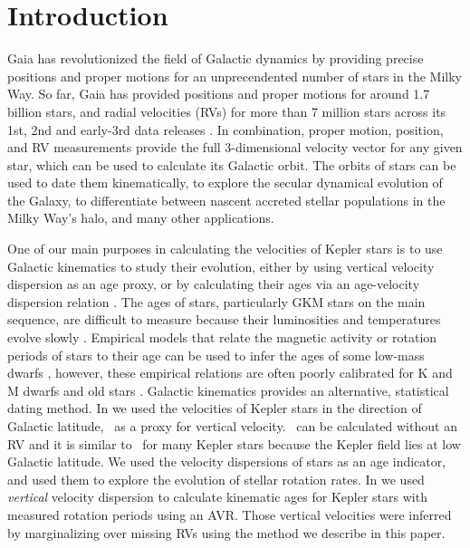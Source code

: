 \section{Introduction}

Gaia has revolutionized the field of Galactic dynamics by providing precise
positions and proper motions for an unprecendented number of stars in the
Milky Way.
So far, Gaia has provided positions and proper motions for around 1.7 billion
stars, and radial velocities (RVs) for more than 7 million stars across its
1st, 2nd and early-3rd data releases \citep{gaia, gaia_dr2, gaia_edr3}.
In combination, proper motion, position, and RV measurements provide the full
3-dimensional velocity vector for any given star, which can be used to
calculate its Galactic orbit.
The orbits of stars can be used to date them kinematically, to explore the
secular dynamical evolution of the Galaxy, to differentiate between nascent
accreted stellar populations in the Milky Way's halo, and many other
applications.

One of our main purposes in calculating the velocities of Kepler stars is to
use Galactic kinematics to study their evolution, either by using vertical
velocity dispersion as an age proxy, or by calculating their ages via an
age-velocity dispersion relation \citep[\eg][]{angus2020, lu2021}.
The ages of stars, particularly GKM stars on the main sequence, are difficult
to measure because their luminosities and temperatures evolve slowly
\citep[see][for a review of stellar ages]{soderblom2010}.
Empirical models that relate the magnetic activity or rotation periods of
stars to their age can be used to infer the ages of some low-mass dwarfs
\citep[\eg][]{skumanich1972, barnes2003, barnes2007, mamajek2008, angus2015,
angus2019, claytor2020}, however, these empirical relations are often poorly
calibrated for K and M dwarfs and old stars \citep[\eg][]{angus2015,
vansaders2016, vansaders2018, metcalfe2019, curtis2020, spada2019, angus2020}.
Galactic kinematics provides an alternative, statistical dating method.
In \citet{angus2020} we used the velocities of Kepler stars in the direction
of Galactic latitude, \vb\, as a proxy for vertical velocity.
\vb\ can be calculated without an RV and it is similar to \vz\ for many Kepler
stars because the Kepler field lies at low Galactic latitude.
We used the velocity dispersions of stars as an age indicator, and used them
to explore the evolution of stellar rotation rates.
In \citet{lu2021} we used {\it vertical} velocity dispersion to calculate
kinematic ages for Kepler stars with measured rotation periods using an AVR.
Those vertical velocities were inferred by marginalizing over missing RVs
using the method we describe in this paper.

